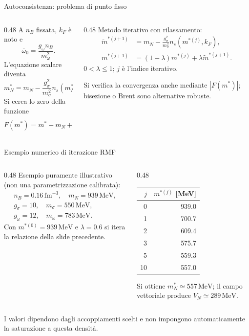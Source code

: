 \begin{frame}{Autoconsistenza: problema di punto fisso}
\small
\begin{columns}[T,onlytextwidth]
\begin{column}{0.48\textwidth}
A $n_B$ fissata, $k_F$ è noto e
\[
 \bar\omega_0=\frac{g_\omega n_B}{m_\omega^2}.
\]
L'equazione scalare diventa
\[
 m_N^*=m_N-
 \frac{g_\sigma^2}{m_\sigma^2}n_s(m_N^*,k_F).
\]
Si cerca lo zero della funzione
\[
 F(m^*)=m^*-m_N+
 \frac{g_\sigma^2}{m_\sigma^2}n_s(m^*,k_F).
\]
\end{column}
\begin{column}{0.48\textwidth}
Metodo iterativo con rilassamento:
\[
 \begin{aligned}
 \widetilde m^{*(j+1)}&=m_N-
 \frac{g_\sigma^2}{m_\sigma^2}n_s(m^{*(j)},k_F),\\
 m^{*(j+1)}&=(1-\lambda)m^{*(j)}
 +\lambda\widetilde m^{*(j+1)}.
 \end{aligned}
\]
$0<\lambda\le1$; $j$ è l'indice iterativo.

Si verifica la convergenza anche mediante $|F(m^*)|$; bisezione o Brent sono alternative robuste.
\end{column}
\end{columns}
\end{frame}

\begin{frame}{Esempio numerico di iterazione RMF}
\small
\begin{columns}[T,onlytextwidth]
\begin{column}{0.48\textwidth}
Esempio puramente illustrativo (non una parametrizzazione calibrata):
\[
 \begin{gathered}
 n_B=0.16\,\mathrm{fm}^{-3},\quad m_N=939\,\mathrm{MeV},\\
 g_\sigma=10,\quad m_\sigma=550\,\mathrm{MeV},\\
 g_\omega=12,\quad m_\omega=783\,\mathrm{MeV}.
 \end{gathered}
\]
Con $m^{*(0)}=939\,\mathrm{MeV}$ e $\lambda=0.6$ si itera la relazione della slide precedente.
\end{column}
\begin{column}{0.48\textwidth}
\begin{center}
\begin{tabular}{r r}
\hline
$j$ & $m^{*(j)}$ [MeV]\\ \hline
0 & 939.0\\
1 & 700.7\\
2 & 609.4\\
3 & 575.7\\
5 & 559.3\\
10 & 557.0\\ \hline
\end{tabular}
\end{center}
Si ottiene $m_N^*\simeq557\,\mathrm{MeV}$; il campo vettoriale produce $V_N\simeq289\,\mathrm{MeV}$.
\end{column}
\end{columns}
\medskip
I valori dipendono dagli accoppiamenti scelti e non impongono automaticamente la saturazione a questa densità.
\end{frame}

